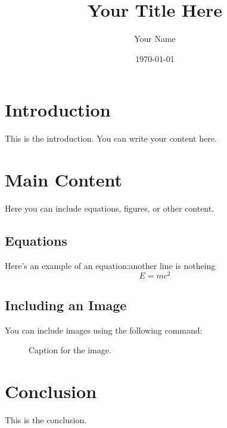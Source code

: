\documentclass{article} %
\title{Your Title Here} %
\author{Your Name} %
\date{\today} %
\begin{document}

\maketitle %

\section{Introduction} %
This is the introduction. You can write your content here.

\section{Main Content} %
Here you can include equations, figures, or other content.

\subsection{Equations} %
Here’s an example of an equation:another line is notheing
\begin{equation}
E = mc^2
\end{equation}

\subsection{Including an Image}
You can include images using the following command:
\begin{figure}[h]
    \centering
   
    \caption{Caption for the image.}

\end{figure}

\section{Conclusion} %
This is the conclusion.
\end{document}
